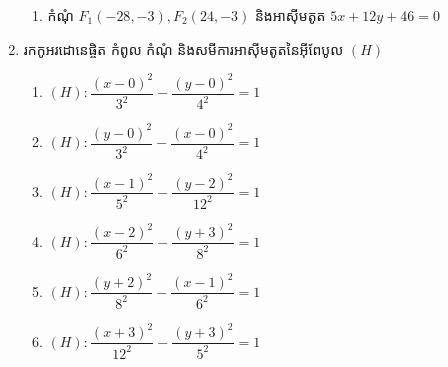 \begin{enumerate}
\begin{enumerate}
		\item កំណុំ $ F_1(-28,-3),F_2(24,-3) $ និងអាស៊ីមតូត $ 5x+12y+46=0 $%
	\end{enumerate}
	\item រកកូអរដោនេផ្ចិត កំពូល កំណុំ និងសមីការអាស៊ីមតូតនៃអ៊ីពែបូល $ (H) $
	\begin{enumerate}[2]
		\item $ (H):\dfrac{(x-0)^2}{3^2}-\dfrac{(y-0)^2}{4^2}=1 $
		\item $ (H):\dfrac{(y-0)^2}{3^2}-\dfrac{(x-0)^2}{4^2}=1 $
		\item $ (H):\dfrac{(x-1)^2}{5^2}-\dfrac{(y-2)^2}{12^2}=1 $
		\item $ (H):\dfrac{(x-2)^2}{6^2}-\dfrac{(y+3)^2}{8^2}=1 $
		\item $ (H):\dfrac{(y+2)^2}{8^2}-\dfrac{(x-1)^2}{6^2}=1 $
		\item $ (H):\dfrac{(x+3)^2}{12^2}-\dfrac{(y+3)^2}{5^2}=1 $
	\end{enumerate}
\end{enumerate}
%